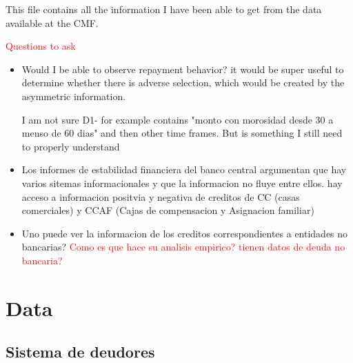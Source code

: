 \documentclass[12pt]{article}
\theoremstyle{plain}
\theoremstyle{plain}
\theoremstyle{definition}  %
\theoremstyle{remark}  %
\begin{document}
This file contains all the information I have been able to get from the data available at the CMF. 


\vspace{3cm}
\textcolor{red}{Questions to ask}

\begin{itemize}
    \item Would I be able to observe repayment behavior? it would be super useful to determine whether there is adverse selection, which would be created by the asymmetric information. 
    
    I am not sure D1- for example contains "monto con morosidad desde 30 a menso de 60 dias" and then other time frames. But is something I still need to properly understand
    
 
    \item Los informes de estabilidad financiera del banco central argumentan que hay varios sitemas informacionales y que la informacion no fluye entre ellos. hay acceso a informacion positvia y negativa de creditos de CC (casas comerciales) y CCAF (Cajas de compensacion y Asignacion familiar) 
    
    \item Uno puede ver la informacion de los creditos correspondientes a entidades no bancarias? 
    \textcolor{red}{Como es que \cite{liberman_equilibrium_2018} hace su analisis empirico? tienen datos de deuda no bancaria?}



\end{itemize}





\section{Data}

\subsection{Sistema de deudores}
\end{document}
